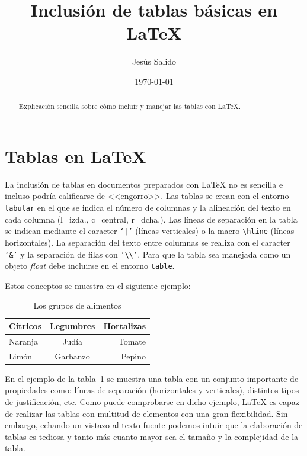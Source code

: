 \documentclass[11pt,a4paper]{article}
\author{Jesús Salido}
\title{Inclusión de tablas básicas en \LaTeX{}}
\date{\today}
\begin{document}
\maketitle


\begin{abstract}
	Explicación sencilla sobre cómo incluir y manejar las tablas con \LaTeX{}.
\end{abstract}

\tableofcontents


\listoftables





\section{Tablas en \LaTeX{}}
La inclusión de tablas en documentos preparados con \LaTeX{} no es sencilla e incluso podría calificarse de <<engorro>>. Las tablas se crean con el entorno \texttt{tabular} en el que se indica el número de columnas y la alineación del texto en cada columna (l=izda., c=central, r=dcha.). Las líneas de separación en la tabla se indican mediante el caracter \texttt{`|'} (líneas verticales) o la macro \texttt{\textbackslash hline} (líneas horizontales). La separación del texto entre columnas se realiza con el caracter \texttt{`\&'} y la separación de filas con \texttt{`\textbackslash\textbackslash'}. Para que la tabla sea manejada como un objeto \emph{float} debe incluirse en el entorno \texttt{table}.

Estos conceptos se muestra en el siguiente ejemplo:

\begin{table}[htb]%
	\centering
	\caption[Ejemplo de entorno \texttt{table}]{Los grupos de alimentos}		  \label{tab:alimentos}
	\begin{tabular}{| l | c | r | }
		\hline			
		\textbf{Cítricos} & \textbf{Legumbres} & \textbf{Hortalizas} \\ \hline \hline
		Naranja  & Judía     & Tomate \\ \hline
		Limón    & Garbanzo  & Pepino \\ \hline  
	\end{tabular}
\end{table}

En el ejemplo de la tabla~\ref{tab:alimentos} se muestra una tabla con un conjunto importante de propiedades como: líneas de separación (horizontales y verticales), distintos tipos de justificación, etc. Como puede comprobarse en dicho ejemplo, \LaTeX{} es capaz de realizar las tablas con multitud de elementos con una gran flexibilidad. Sin embargo, echando un vistazo al texto fuente podemos intuir que la elaboración de tablas es tediosa y tanto más cuanto mayor sea el tamaño y la complejidad de la tabla.
\end{document}
